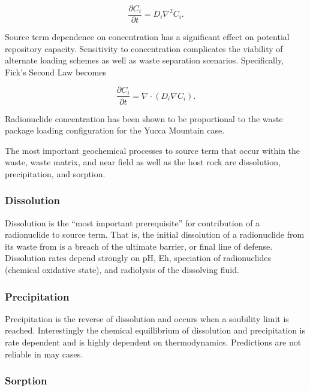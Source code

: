 \begin{equation} 
  \frac{\partial C_i}{\partial t}  = D_i\nabla^2 C_i.  
\end{equation}

Source term dependence on concentration has a significant effect on potential
repository capacity. Sensitivity to concentration complicates the viability of
alternate loading schemes as well as waste separation scenarios. Specifically, 
Fick's Second Law becomes 

\begin{equation} 
  \frac{\partial C_i}{\partial t}  = \nabla \cdot ( D_i \nabla C_i ). 
\end{equation}

Radionuclide concentration has been shown to be proportional to the waste package
loading configuration for the Yucca Mountain case. 
\cite{ahn_relationship_2002,kawasaki_congruent_2004}

The most important geochemical processes to source term that occur within the
waste, waste matrix, and near field as well as the host rock are dissolution,
precipitation, and sorption.  \cite{bracke_safety_2008}

\subsubsection{Dissolution}

Dissolution is the ``most important prerequisite'' for contribution of a
radionuclide to source term.\cite{bracke_safety_2008} That is, the initial 
dissolution of a radionuclide from its waste from is a breach of the ultimate 
barrier, or final line of defense. Dissolution rates depend strongly on pH, Eh,
speciation of radionuclides (chemical oxidative state), and radiolysis of the
dissolving fluid.

\subsubsection{Precipitation}

Precipitation is the reverse of dissolution and occurs when a soubility limit
is reached. Interestingly the chemical equillibrium of dissolution and
precipitation is rate dependent and is highly dependent on thermodynamics.
Predictions are not reliable in may cases.

\subsubsection{Sorption}

